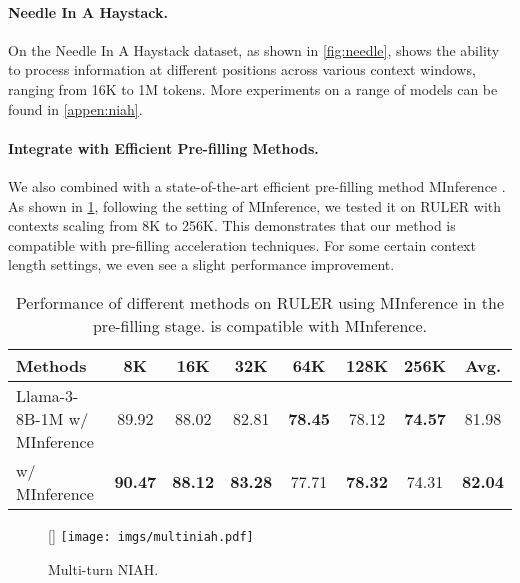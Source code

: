 \paragraph{Needle In A Haystack.} On the Needle In A Haystack dataset, as shown in \cref{fig:needle}, \Sys shows the ability to process information at different positions across various context windows, ranging from 16K to 1M tokens. More experiments on a range of models can be found in \cref{appen:niah}.

\paragraph{Integrate with Efficient Pre-filling Methods.} We also combined \Sys with a state-of-the-art efficient pre-filling method MInference \citep{jiang2024minference}. As shown in \cref{tab:minference}, following the setting of MInference, we tested it on RULER with contexts scaling from 8K to 256K. This demonstrates that our method is compatible with pre-filling acceleration techniques. For some certain context length settings, we even see a slight performance improvement.

\begin{table}[h]
\centering
\caption{Performance of different methods on RULER \citep{hsieh2024ruler} using MInference \citep{jiang2024minference} in the pre-filling stage. \Sys is compatible with MInference.}
\begin{tabular}{l|cccccc|c}
\toprule
Methods & 8K& 16K& 32K & 64K & 128K& 256K& Avg.\\ \midrule
	Llama-3-8B-1M w/ MInference &89.92&88.02&82.81&\textbf{78.45}&78.12&\textbf{74.57}&81.98 \\
	\Sys  w/ MInference  &\textbf{90.47}&\textbf{88.12}&\textbf{83.28}&77.71&\textbf{78.32}& 74.31&\textbf{82.04} \\
	
  \bottomrule
\end{tabular}
\label{tab:minference}
\end{table}

\begin{wrapfigure}[10]{r}{0pt}
    \centering
	\raisebox{-45pt}[\dimexpr{}\baselineskip\relax]{%
	        \texttt{[image: imgs/multiniah.pdf]}%
	    }%
    \caption{Multi-turn NIAH.}
    \label{fig:multi-turn}
\end{wrapfigure}
